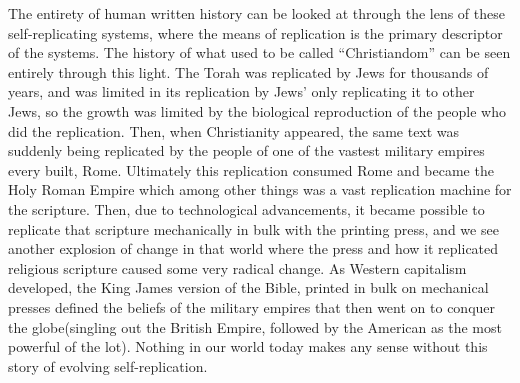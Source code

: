 The entirety of human written history can be looked at through the lens
of these self-replicating systems, where the means of replication is the
primary descriptor of the systems. The history of what used to be called
``Christiandom'' can be seen entirely through this light. The Torah was
replicated by Jews for thousands of years, and was limited in its
replication by Jews' only replicating it to other Jews, so the growth
was limited by the biological reproduction of the people who did the
replication. Then, when Christianity appeared, the same text was
suddenly being replicated by the people of one of the vastest military
empires every built, Rome. Ultimately this replication consumed Rome and
became the Holy Roman Empire which among other things was a vast
replication machine for the scripture. Then, due to technological
advancements, it became possible to replicate that scripture
mechanically in bulk with the printing press, and we see another
explosion of change in that world where the press and how it replicated
religious scripture caused some very radical change. As Western
capitalism developed, the King James version of the Bible, printed in
bulk on mechanical presses defined the beliefs of the military empires
that then went on to conquer the globe(singling out the British Empire,
followed by the American as the most powerful of the lot). Nothing in
our world today makes any sense without this story of evolving
self-replication.

